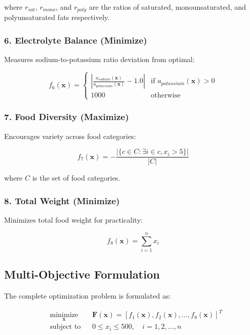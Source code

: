 \documentclass[12pt,a4paper]{article}
\begin{document}
where $r_{sat}$, $r_{mono}$, and $r_{poly}$ are the ratios of saturated, monounsaturated, and polyunsaturated fats respectively.

\subsubsection{6. Electrolyte Balance (Minimize)}

Measures sodium-to-potassium ratio deviation from optimal:

\begin{equation}
f_6(\mathbf{x}) = \begin{cases}
\left|\frac{a_{sodium}(\mathbf{x})}{a_{potassium}(\mathbf{x})} - 1.0\right| & \text{if } a_{potassium}(\mathbf{x}) > 0 \\
1000 & \text{otherwise}
\end{cases}
\end{equation}

\subsubsection{7. Food Diversity (Maximize)}

Encourages variety across food categories:

\begin{equation}
f_7(\mathbf{x}) = -\frac{|\{c \in C : \exists i \in c, x_i > 5\}|}{|C|}
\end{equation}

where $C$ is the set of food categories.

\subsubsection{8. Total Weight (Minimize)}

Minimizes total food weight for practicality:

\begin{equation}
f_8(\mathbf{x}) = \sum_{i=1}^{n} x_i
\end{equation}

\subsection{Multi-Objective Formulation}

The complete optimization problem is formulated as:

\begin{equation}
\begin{aligned}
& \underset{\mathbf{x}}{\text{minimize}}
& & \mathbf{F}(\mathbf{x}) = [f_1(\mathbf{x}), f_2(\mathbf{x}), \ldots, f_8(\mathbf{x})]^T \\
& \text{subject to}
& & 0 \leq x_i \leq 500, \quad i = 1, 2, \ldots, n
\end{aligned}
\end{equation}
\end{document}
